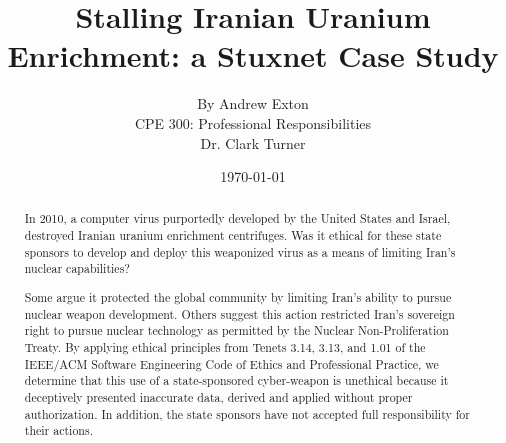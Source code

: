\documentclass[12pt]{article}
\begin{document}
\title{\vfill Stalling Iranian Uranium Enrichment: a Stuxnet Case Study } %
\author{
By Andrew Exton \vspace{10pt} \\
CPE 300: Professional Responsibilities  \vspace{10pt} \\
Dr. Clark Turner \vspace{10pt} \\
}
\date{\today} %

\maketitle

\vfill  %
\begin{abstract}

In 2010, a computer virus purportedly developed by the United States and Israel, destroyed Iranian uranium enrichment centrifuges.\cite{theRealStoryOfStuxnet} Was it ethical for these state sponsors to develop and deploy this weaponized virus as a means of limiting Iran's nuclear capabilities?

Some argue it protected the global community by limiting Iran's ability to pursue nuclear weapon development.\cite{theRealStoryOfStuxnet} Others suggest this action restricted Iran's sovereign right to pursue nuclear technology as permitted by the Nuclear Non-Proliferation Treaty.\cite{lookIntoIranianNuclearProgram} By applying ethical principles from Tenets 3.14, 3.13, and 1.01 of the IEEE/ACM Software Engineering Code of Ethics and Professional Practice, we determine that this use of a state-sponsored cyber-weapon is unethical because it deceptively presented inaccurate data, derived and applied without proper authorization. In addition, the state sponsors have not accepted full responsibility for their actions.


\end{abstract}

\thispagestyle{empty} %
\newpage

\tableofcontents
\newpage
\end{document}
